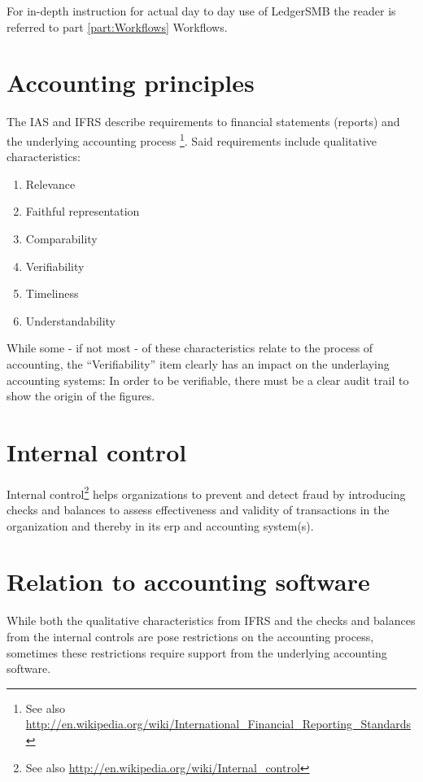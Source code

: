 For in-depth instruction for actual day to day use of LedgerSMB the reader is referred
to part \ref{part:Workflows} Workflows.


\section{Accounting principles}

The \gls{IAS} and \gls{IFRS} describe requirements
to financial statements (reports) and the underlying accounting process
\footnote{See also \url{http://en.wikipedia.org/wiki/International\_Financial\_Reporting\_Standards}}.
Said requirements include qualitative characteristics:

\begin{enumerate}
\item Relevance
\item Faithful representation
\item Comparability
\item Verifiability
\item Timeliness
\item Understandability
\end{enumerate}

While some - if not most - of these characteristics relate to the process of accounting,
the ``Verifiability'' item clearly has an impact on the underlaying accounting systems:
In order to be verifiable, there must be a clear audit trail to show the origin of the
figures.

\section{Internal control}

Internal control\footnote{See also \url{http://en.wikipedia.org/wiki/Internal\_control}}
helps organizations to prevent and detect fraud by introducing checks and balances
to assess effectiveness and validity of transactions in the organization and thereby
in its \gls{erp} and accounting system(s).


\section{Relation to accounting software}
\label{sec:AccountingSystemRequirements}

While both the qualitative characteristics from \gls{IFRS} and the checks and balances
from the internal controls are pose restrictions on the accounting process,
sometimes these restrictions require support from the underlying accounting
software.

